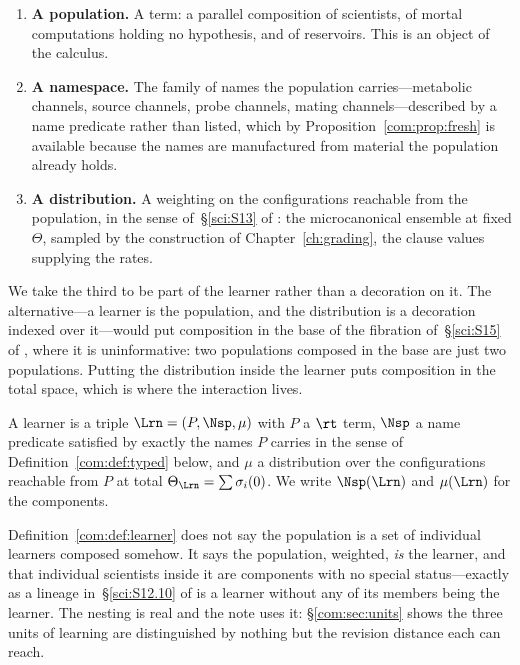 \begin{enumerate}[label=(\roman*)]
\item \textbf{A population.} A term: a parallel composition of scientists, of mortal
computations holding no hypothesis, and of reservoirs. This is an object of the calculus.
\item \textbf{A namespace.} The family of names the population carries---metabolic channels,
source channels, probe channels, mating channels---described by a name predicate rather than
listed, which by Proposition~\ref{com:prop:fresh} is available because the names are manufactured
from material the population already holds.
\item \textbf{A distribution.} A weighting on the configurations reachable from the population,
in the sense of~\S\ref{sci:S13} of \chSci: the microcanonical ensemble at fixed $\Theta$, sampled by
the construction of Chapter~\ref{ch:grading}, the clause values supplying the rates.
\end{enumerate}

We take the third to be part of the learner rather than a decoration on it. The alternative---a
learner is the population, and the distribution is a decoration indexed over it---would put
composition in the base of the fibration of~\S\ref{sci:S15} of \chSci, where it is uninformative:
two populations composed in the base are just two populations. Putting the distribution inside
the learner puts composition in the total space, which is where the interaction lives.

\begin{definition}[Learner]\label{com:def:learner}
A learner is a triple $\Lrn = (P, \Nsp, \mu)$ with $P$ a $\rt$ term, $\Nsp$ a name predicate
satisfied by exactly the names $P$ carries in the sense of Definition~\ref{com:def:typed} below, and
$\mu$ a distribution over the configurations reachable from $P$ at total $\Theta_{\Lrn} =
\sum \sigma_i(0)$. We write $\Nsp(\Lrn)$ and $\mu(\Lrn)$ for the components.
\end{definition}

\begin{remark}\label{com:population-bag-learners}
Definition~\ref{com:def:learner} does not say the population is a set of individual learners composed
somehow. It says the population, weighted, \emph{is} the learner, and that individual scientists
inside it are components with no special status---exactly as a lineage in~\S\ref{sci:S12.10} of \chSci
is a learner without any of its members being the learner. The nesting is real and the note uses
it: \S\ref{com:sec:units} shows the three units of learning are distinguished by nothing but the
revision distance each can reach.
\end{remark}

